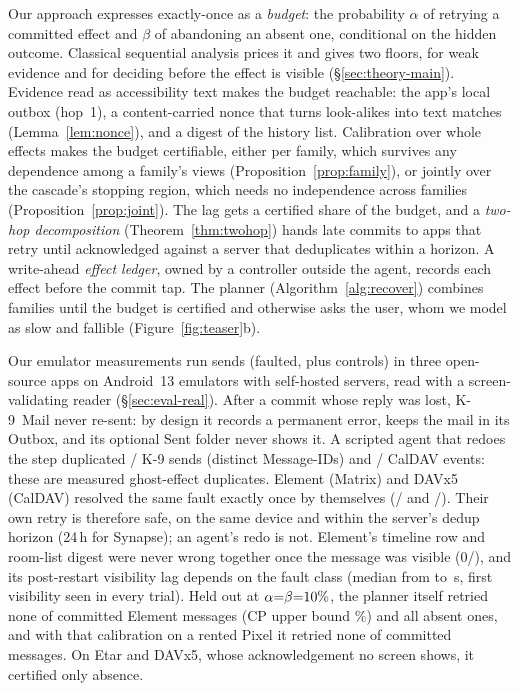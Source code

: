 Our approach expresses exactly-once as a \emph{budget}: the probability $\alpha$ of retrying a committed effect and $\beta$ of abandoning an absent one, conditional on the hidden outcome.
Classical sequential analysis prices it and gives two floors, for weak evidence and for deciding before the effect is visible (\S\ref{sec:theory-main}). Evidence read as
accessibility text makes the budget reachable: the app's local outbox (hop~1), a content-carried nonce that turns look-alikes into text matches (Lemma~\ref{lem:nonce}), and a
digest of the history list. Calibration over whole effects makes the budget certifiable, either per family, which survives any dependence among a family's views
(Proposition~\ref{prop:family}), or jointly over the cascade's stopping region, which needs no independence across families (Proposition~\ref{prop:joint}). The lag gets a
certified share of the budget, and a \emph{two-hop decomposition} (Theorem~\ref{thm:twohop}) hands late commits to apps that retry until acknowledged against a server that
deduplicates within a horizon. A write-ahead \emph{effect ledger}, owned by a controller outside the agent, records each effect before the commit tap. The \alg planner
(Algorithm~\ref{alg:recover}) combines families until the budget is certified and otherwise asks the user, whom we model as slow and fallible (Figure~\ref{fig:teaser}b).

Our emulator measurements run \RealTwoN{} sends (faulted, plus controls) in three open-source apps on Android~13 emulators with self-hosted servers, read with a screen-validating
reader (\S\ref{sec:eval-real}). After a commit whose reply was lost, K-9~Mail never re-sent: by design it records a permanent error, keeps the mail in its Outbox, and its
optional Sent folder never shows it. A scripted agent that redoes the step duplicated \RealKRecDup/\RealKRecN{} K-9 sends (distinct Message-IDs) and \RealCalRecDup/\RealCalRecN{}
CalDAV events: these are measured ghost-effect duplicates. Element (Matrix) and DAVx5 (CalDAV) resolved the same fault exactly once by themselves (\RealElemRL/\RealElemRL{}
and \RealCalN/\RealCalN). Their own retry is therefore safe, on the same device and within the server's dedup horizon (24\,h for Synapse); an agent's redo is not.
Element's timeline row and room-list digest were never wrong together once the message was visible (0/\RealCoObs), and its post-restart visibility lag depends on the fault class
(median from \RealLagNetMed{} to \RealLagLmkMed\,s, first visibility seen in every trial).
Held out at $\alpha{=}\beta{=}10\%$, the planner itself retried none of \RealElPlanCommittedN{} committed Element messages (CP upper bound \RealElPlanRetryHi\%) and all
\RealElPlanRetryAbsent{} absent ones, and with that calibration on a rented Pixel it retried none of \PixTCom{} committed messages. On Etar and DAVx5, whose acknowledgement no screen shows, it certified only absence.

